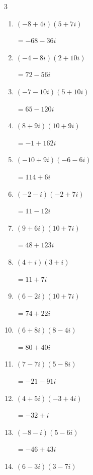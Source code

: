 \begin{multicols}{3}
\begin{enumerate}
  \item $\displaystyle (-8+4i)(5+7i)$

        $\displaystyle =-68-36i$

  \item $\displaystyle (-4-8i)(2+10i)$

        $\displaystyle =72-56i$

  \item $\displaystyle (-7-10i)(5+10i)$

        $\displaystyle =65-120i$

  \item $\displaystyle (8+9i)(10+9i)$

        $\displaystyle =-1+162i$

  \item $\displaystyle (-10+9i)(-6-6i)$

        $\displaystyle =114+6i$

  \item $\displaystyle (-2-i)(-2+7i)$

        $\displaystyle =11-12i$

  \item $\displaystyle (9+6i)(10+7i)$

        $\displaystyle =48+123i$

  \item $\displaystyle (4+i)(3+i)$

        $\displaystyle =11+7i$

  \item $\displaystyle (6-2i)(10+7i)$

        $\displaystyle =74+22i$

  \item $\displaystyle (6+8i)(8-4i)$

        $\displaystyle =80+40i$

  \item $\displaystyle (7-7i)(5-8i)$

        $\displaystyle =-21-91i$

  \item $\displaystyle (4+5i)(-3+4i)$

        $\displaystyle =-32+i$

  \item $\displaystyle (-8-i)(5-6i)$

        $\displaystyle =-46+43i$

  \item $\displaystyle (6-3i)(3-7i)$


\end{enumerate}
\end{multicols}
